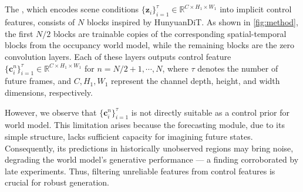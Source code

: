 


\subsection{\mtd{} \ctln{}}\label{sec:method_ctrl}


The \mtd{} \ctln{}, which encodes scene conditions $\{\mathbf{z}_i\}_{i=1}^{\tau} \in \mathbb{R}^{C \times H_1\times W_1}$ into implicit control features, consists of $N$ blocks inspired by HunyuanDiT\cite{hunyuandit}.
As shown in \cref{fig:method}, the first $N/2$ blocks are trainable copies of the corresponding spatial-temporal blocks from the occupancy world model, while the remaining blocks are the zero convolution layers.
Each of these layers outputs control feature $\{\mathbf{c}^n_i\}_{i=1}^{\tau} \in \mathbb{R}^{C \times H_1 \times W_1}$ for $n=N/2+1, \cdots, N$, where $\tau$ denotes the number of future frames, and $C, H_1, W_1$ represent the channel depth, height, and width dimensions, respectively.


However, we observe that $\{\mathbf{c}^n_i\}_{i=1}^{\tau}$ is not directly suitable as a control prior for world model. 
This limitation arises because the forecasting module, due to its simple structure, lacks sufficient capacity for imagining future states. 
Consequently, its predictions in historically unobserved regions may bring noise, degrading the world model's generative performance — a finding corroborated by late experiments. 
Thus, filtering unreliable features from control features is crucial for robust generation.

